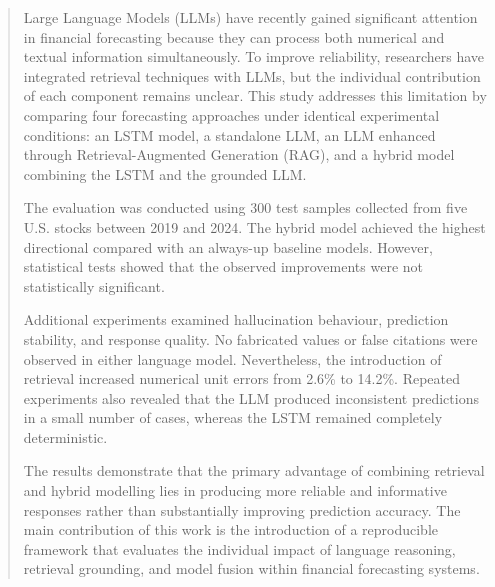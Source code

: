 \begin{abstract}

Large Language Models (LLMs) have recently gained significant attention
in financial forecasting because they can process both numerical and
textual information simultaneously. To improve reliability, researchers
have integrated retrieval techniques with LLMs, but the individual
contribution of each component remains unclear. This study addresses
this limitation by comparing four forecasting approaches under identical
experimental conditions: an LSTM model, a standalone LLM, an LLM
enhanced through Retrieval-Augmented Generation (RAG), and a hybrid
model combining the LSTM and the grounded LLM.

The evaluation was conducted using 300 test samples collected from five
U.S. stocks between 2019 and 2024. The hybrid model achieved the highest
directional compared with an always-up baseline models. However, statistical tests showed that the observed
improvements were not statistically significant.

Additional experiments examined hallucination behaviour, prediction
stability, and response quality. No fabricated values or false citations
were observed in either language model. Nevertheless, the introduction
of retrieval increased numerical unit errors from 2.6\% to 14.2\%.
Repeated experiments also revealed that the LLM produced inconsistent
predictions in a small number of cases, whereas the LSTM remained
completely deterministic.

The results demonstrate that the primary advantage of combining
retrieval and hybrid modelling lies in producing more reliable and
informative responses rather than substantially improving prediction
accuracy. The main contribution of this work is the introduction of a
reproducible framework that evaluates the individual impact of language
reasoning, retrieval grounding, and model fusion within financial
forecasting systems.

\end{abstract}
